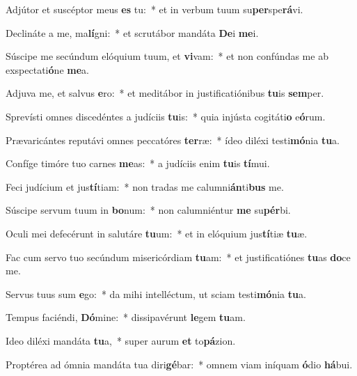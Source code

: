 \item Adjútor et suscéptor meus \textbf{es} tu:~* et in verbum tuum su\textbf{per}spe\textbf{rá}vi.
\item Declináte a me, ma\textbf{lí}gni:~* et scrutábor mandáta \textbf{De}i \textbf{me}i.
\item Súscipe me secúndum elóquium tuum, et \textbf{vi}vam:~* et non confúndas me ab exspectati\textbf{ó}ne \textbf{me}a.
\item Adjuva me, et salvus \textbf{e}ro:~* et meditábor in justificatiónibus \textbf{tu}is \textbf{sem}per.
\item Sprevísti omnes discedéntes a judíciis \textbf{tu}is:~* quia injústa cogitáti\textbf{o} e\textbf{ó}rum.
\item Prævaricántes reputávi omnes peccatóres \textbf{ter}ræ:~* ídeo diléxi testi\textbf{mó}nia \textbf{tu}a.
\item Confíge timóre tuo carnes \textbf{me}as:~* a judíciis enim \textbf{tu}is \textbf{tí}mui.
\item Feci judícium et jus\textbf{tí}tiam:~* non tradas me calumni\textbf{án}ti\textbf{bus} me.
\item Súscipe servum tuum in \textbf{bo}num:~* non calumniéntur \textbf{me} su\textbf{pér}bi.
\item Oculi mei defecérunt in salutáre \textbf{tu}um:~* et in elóquium jus\textbf{tí}tiæ \textbf{tu}æ.
\item Fac cum servo tuo secúndum misericórdiam \textbf{tu}am:~* et justificatiónes \textbf{tu}as \textbf{do}ce me.
\item Servus tuus sum \textbf{e}go:~* da mihi intelléctum, ut sciam testi\textbf{mó}nia \textbf{tu}a.
\item Tempus faciéndi, \textbf{Dó}mine:~* dissipavérunt \textbf{le}gem \textbf{tu}am.
\item Ideo diléxi mandáta \textbf{tu}a,~* super aurum \textbf{et} to\textbf{pá}zion.
\item Proptérea ad ómnia mandáta tua diri\textbf{gé}bar:~* omnem viam iníquam \textbf{ó}dio \textbf{há}bui.
